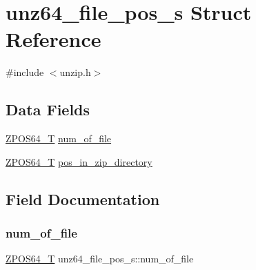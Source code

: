 \hypertarget{structunz64__file__pos__s}{}\section{unz64\+\_\+file\+\_\+pos\+\_\+s Struct Reference}
\label{structunz64__file__pos__s}


{\ttfamily \#include $<$unzip.\+h$>$}

\subsection*{Data Fields}
\begin{DoxyCompactItemize}
\item 
\hyperlink{ioapi_8h_afffed08ed7f2413fa38e12a223ae0e72}{Z\+P\+O\+S64\+\_\+T} \hyperlink{structunz64__file__pos__s_a3750057b6e72229a7acfb12b23bcb2fb}{num\+\_\+of\+\_\+file}
\item 
\hyperlink{ioapi_8h_afffed08ed7f2413fa38e12a223ae0e72}{Z\+P\+O\+S64\+\_\+T} \hyperlink{structunz64__file__pos__s_a56b202151059b18903fe46dacbfbf12d}{pos\+\_\+in\+\_\+zip\+\_\+directory}
\end{DoxyCompactItemize}


\subsection{Field Documentation}
\mbox{\label{structunz64__file__pos__s_a3750057b6e72229a7acfb12b23bcb2fb}} 
\subsubsection{\texorpdfstring{num\+\_\+of\+\_\+file}{num\_of\_file}}
{\footnotesize\ttfamily \hyperlink{ioapi_8h_afffed08ed7f2413fa38e12a223ae0e72}{Z\+P\+O\+S64\+\_\+T} unz64\+\_\+file\+\_\+pos\+\_\+s\+::num\+\_\+of\+\_\+file}

\mbox{\label{structunz64__file__pos__s_a56b202151059b18903fe46dacbfbf12d}} 

